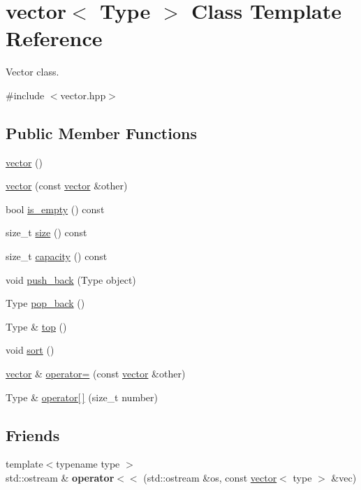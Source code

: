 \hypertarget{classvector}{}\section{vector$<$ Type $>$ Class Template Reference}
\label{classvector}


Vector class.  




{\ttfamily \#include $<$vector.\+hpp$>$}

\subsection*{Public Member Functions}
\begin{DoxyCompactItemize}
\item 
\hyperlink{classvector_ab8d8ebaa9b91a05bb7a94371cb84c042}{vector} ()
\item 
\hyperlink{classvector_a10b4b80ca03a29381b4d75bd8f64a32b}{vector} (const \hyperlink{classvector}{vector} \&other)
\item 
bool \hyperlink{classvector_a5072f21798cab28caba5ce11a63641b9}{is\+\_\+empty} () const
\item 
size\+\_\+t \hyperlink{classvector_a93899e95a36d1f3a24cc0e97314d9846}{size} () const
\item 
size\+\_\+t \hyperlink{classvector_a328c8b698588cbe76e44fa358f94cc83}{capacity} () const
\item 
void \hyperlink{classvector_a7969701b971bcceeba65b2150ea4a1a4}{push\+\_\+back} (Type object)
\item 
Type \hyperlink{classvector_a33e617a81ec2561bd840b8090e38a083}{pop\+\_\+back} ()
\item 
Type \& \hyperlink{classvector_aa9f52560c183491e8741ce10d7c54451}{top} ()
\item 
void \hyperlink{classvector_a07b7c89f4914f1558409e81ca0fe4e72}{sort} ()
\item 
\hyperlink{classvector}{vector} \& \hyperlink{classvector_af24b0bef0a5a0b8a3d4a65f0ce959b5f}{operator=} (const \hyperlink{classvector}{vector} \&other)
\item 
Type \& \hyperlink{classvector_ad6b76f293f8827dd0b90bd982b04fd60}{operator\mbox{[}$\,$\mbox{]}} (size\+\_\+t number)
\end{DoxyCompactItemize}
\subsection*{Friends}
\begin{DoxyCompactItemize}
\item 
\mbox{\label{classvector_adf34cc222c696cfe23dfbc3d0a4895b2}} 
{\footnotesize template$<$typename type $>$ }\\std\+::ostream \& {\bfseries operator$<$$<$} (std\+::ostream \&os, const \hyperlink{classvector}{vector}$<$ type $>$ \&vec)
\end{DoxyCompactItemize}


